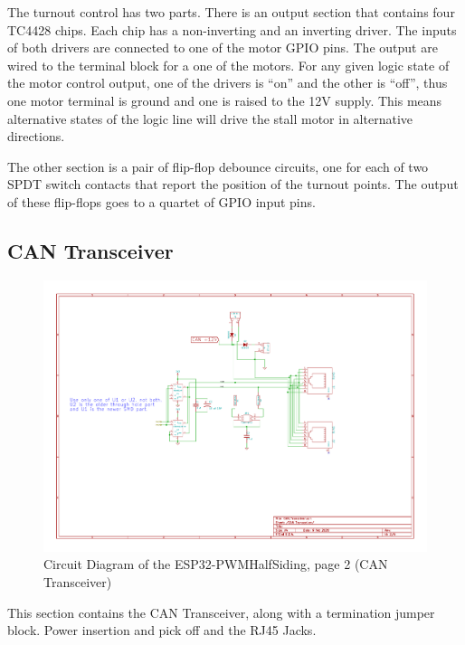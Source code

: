 The turnout control has two parts. There is an output section that contains
four TC4428 chips. Each chip has a non-inverting and an inverting driver. The
inputs of both drivers are connected to one of the motor GPIO pins. The output
are wired to the terminal block for a one of the motors. For any given logic
state of the motor control output, one of the drivers is ``on'' and the other
is ``off'', thus one motor terminal is ground and one is raised to the 12V
supply. This means alternative states of the logic line will drive the stall
motor in alternative directions. 

The other section is a pair of flip-flop debounce circuits, one for each of
two SPDT switch contacts that report the position of the turnout points. The
output of these flip-flops goes to a quartet of GPIO input pins.

\clearpage
\subsection{CAN Transceiver}
\begin{figure}[hbpt]\begin{centering}%
\includegraphics[width=5in]{ESP32-PWMHalfSiding-2.pdf}
\caption{Circuit Diagram of the ESP32-PWMHalfSiding, page 2 (CAN Transceiver)}
\end{centering}\end{figure}

This section contains the CAN Transceiver, along with a termination jumper 
block. Power insertion and pick off and the RJ45 Jacks.

\clearpage
